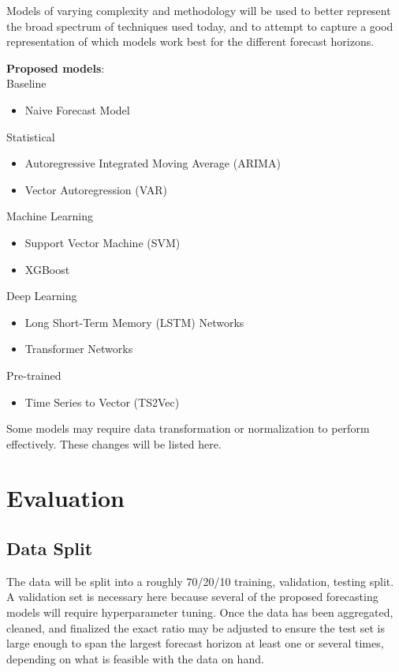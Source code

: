 \documentclass[sigconf]{acmart}
\begin{document}
Models of varying complexity and methodology will be used to better represent the broad spectrum of techniques used today, and to attempt to capture a good representation of which models work best for the different forecast horizons. 

\textbf{Proposed models}:
\\
Baseline
\begin{itemize}
    \item{Naive Forecast Model}
\end{itemize}
Statistical
\begin{itemize}
    \item{Autoregressive Integrated Moving Average (ARIMA)}
    \item{Vector Autoregression (VAR)}
\end{itemize}
Machine Learning
\begin{itemize}
    \item{Support Vector Machine (SVM)}
    \item{XGBoost}
\end{itemize}
Deep Learning
\begin{itemize}
    \item{Long Short-Term Memory (LSTM) Networks}
    \item{Transformer Networks}
\end{itemize}
Pre-trained
\begin{itemize}
    \item{Time Series to Vector (TS2Vec)}
\end{itemize}

Some models may require data transformation or normalization to perform effectively. These changes will be listed here.

\section{Evaluation}

\subsection{Data Split}
The data will be split into a roughly 70/20/10 training, validation, testing split. A validation set is necessary here because several of the proposed forecasting models will require hyperparameter tuning. Once the data has been aggregated, cleaned, and finalized the exact ratio may be adjusted to ensure the test set is large enough to span the largest forecast horizon at least one or several times, depending on what is feasible with the data on hand.
\end{document}
